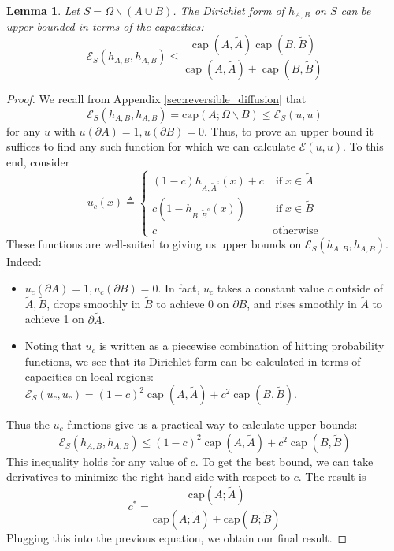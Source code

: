 \documentclass[english, aip, jcp, priprint, graphicx,floatfix]{revtex4-1}
\newcommand{\tmop}[1]{\ensuremath{\operatorname{#1}}}
\newtheorem{lemma}{Lemma}
\theoremstyle{plain}
\theoremstyle{definition}
\theoremstyle{plain}
\newcommand{\capac}[2]{\mathrm{cap}\left(#1;#2\right)}
\begin{document}
\begin{lemma}  Let $S=\Omega \backslash (A\cup B)$.  The Dirichlet form of $h_{A,B}$ on $S$ can be upper-bounded in terms of the capacities:
\[ \mathscr{E}_S(h_{A,B}, h_{A,B}) \leqslant \frac{\tmop{cap} (A, \tilde{A}) \tmop{cap} (B,
\tilde{B})}{\tmop{cap} (A, \tilde{A}) + \tmop{cap} (B, \tilde{B})} \]
\end{lemma}
\begin{proof}
We recall from Appendix \ref{sec:reversible_diffusion} that
%
\[
\mathscr{E}_S(h_{A,B}, h_{A,B}) = \capac{A}{\Omega \backslash B} \leq \mathscr{E}_S (u,u)
\]
%
for any $u$ with $u(\partial A) = 1,u(\partial B) = 0$.  Thus, to prove an upper bound it suffices to find any such function for which we can calculate $\mathscr{E}(u,u)$.  To this end, consider
%
\[
u_c (x) \triangleq \left\{ \begin{array}{ll}
(1 - c) h_{A, \widetilde{A}^c} (x) + c & \tmop{if} x \in \tilde{A} \\
c (1 - h_{B, \widetilde{B}^c} (x)) & \tmop{if} x \in \tilde{B} \\
c & \mbox{otherwise}
\end{array} \right. 
\]
%
These functions are well-suited to giving us upper bounds on $\mathscr{E}_S (h_{A,B}, h_{A,B})$.  Indeed:
\begin{itemize}
\item $u_c(\partial A)=1,u_c(\partial B)=0$.  In fact, $u_c$ takes a constant value $c$ outside of $\tilde A,\tilde B$, drops smoothly in $\tilde B$ to achieve 0 on $\partial B$, and rises smoothly in $\tilde A$ to achieve 1 on $\partial \tilde A$.  
\item Noting that $u_c$ is written as a piecewise combination of hitting probability functions, we see that its Dirichlet form can be calculated in terms of capacities on local regions: $\mathscr{E}_S(u_c,u_c) = (1 - c)^2 \tmop{cap} (A, \tilde{A}) + c^2 \tmop{cap} (B, \tilde{B})$.
\end{itemize}
Thus the $u_c$ functions give us a practical way to calculate upper bounds: 
\[
\mathscr{E}_S(h_{A,B}, h_{A,B})\leq (1 - c)^2 \tmop{cap} (A, \tilde{A}) + c^2 \tmop{cap} (B, \tilde{B})
\]
This inequality holds for any value of $c$.  To get the best bound, we can take derivatives to minimize the right hand side with respect to $c$.  The result is 
\[
c^* = \frac{\capac{A}{\tilde A}}{\capac{A}{\tilde A}+\capac{B}{\tilde B}}
\]
Plugging this into the previous equation, we obtain our final result.
\end{proof}
\end{document}
